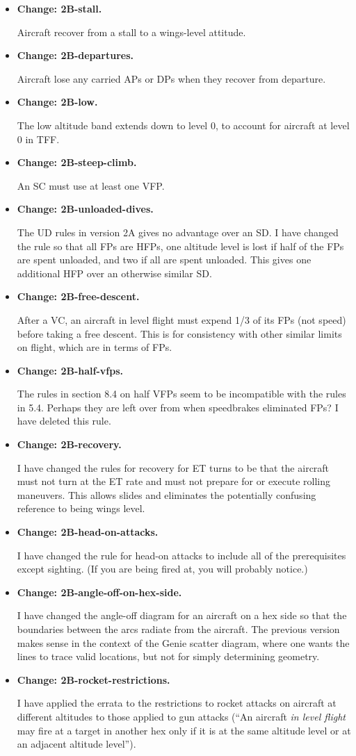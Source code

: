 \documentclass[10pt]{article}
\newcommand{\itemtag}[1]{\item \textbf{Change: #1.}\par}
\begin{document}
\begin{itemize}
    \itemtag{2B-stall} Aircraft recover from a stall to a wings-level attitude.

    \itemtag{2B-departures} Aircraft lose any carried APs or DPs when they recover from departure.

    \itemtag{2B-low} The low altitude band extends down to level 0, to account for aircraft at level 0 in TFF.

    \itemtag{2B-steep-climb} An SC must use at least one VFP.

    \itemtag{2B-unloaded-dives} The UD rules in version 2A gives no advantage over an SD. I have changed the rule so that all FPs are HFPs, one altitude level is lost if half of the FPs are spent unloaded, and two if all are spent unloaded. This gives one additional HFP over an otherwise similar SD.    

    \itemtag{2B-free-descent} After a VC, an aircraft in level flight must expend 1/3 of its FPs (not speed) before taking a free descent. This is for consistency with other similar limits on flight, which are in terms of FPs.

    \itemtag{2B-half-vfps} The rules in section 8.4 on half VFPs seem to be incompatible with the rules in 5.4. Perhaps they are left over from when speedbrakes eliminated FPs? I have deleted this rule.

    \itemtag{2B-recovery} I have changed the rules for recovery for ET turns to be that the aircraft must not turn at the ET rate and must not prepare for or execute rolling maneuvers. This allows slides and eliminates the potentially confusing reference to being wings level.

    \itemtag{2B-head-on-attacks} I have changed the rule for head-on attacks to include all of the prerequisites except sighting. (If you are being fired at, you will probably notice.)

    \itemtag{2B-angle-off-on-hex-side} I have changed the angle-off diagram for an aircraft on a hex side so that the boundaries between the arcs radiate from the aircraft. The previous version makes sense in the context of the Genie scatter diagram, where one wants the lines to trace valid locations, but not for simply determining geometry.

    \itemtag{2B-rocket-restrictions} I have applied the errata to the restrictions to rocket attacks on aircraft at different altitudes to those applied to gun attacks (“An aircraft \emph{in level flight} may fire at a target in another hex only if it is at the same altitude level or at an adjacent altitude level”).


\end{itemize}
\end{document}

